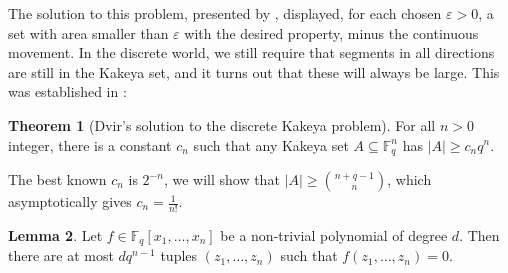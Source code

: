 \documentclass[12pt]{amsart}
\theoremstyle{definition}
\newtheorem{thm}{Theorem}[section]
\newtheorem{lm}[thm]{Lemma}
\newcommand{\F}{\mathbb{F}}
\begin{document}
The solution to this problem, presented by \cite{besicovitch1928kakeya}, displayed, for each chosen $\varepsilon > 0$, a set with area smaller than $\varepsilon $ with the desired property, minus the continuous movement.
In the discrete world, we still require that segments in all directions are still in the Kakeya set, and it turns out that these will always be large.
This was established in \cite{dvir2009size}:

\begin{thm}[Dvir's solution to the discrete Kakeya problem]\label{thm:kakeya}
For all $n > 0 $ integer, there is a constant $c_n$ such that any Kakeya set $A \subseteq \F_q^n$ has $|A| \geq c_n q^n$.
\end{thm}

The best known $c_n$ is $2^{-n}$, we will show that $|A| \geq \binom{n+q-1}{n}$, which asymptotically gives $c_n = \frac{1}{n!}$.

\begin{lm}\label{lm:rootcount}
Let $f \in \F_q[x_1, \ldots, x_n]$ be a non-trivial polynomial of degree $d$.
Then there are at most $d q^{n-1}$ tuples $(z_1, \ldots, z_n)$ such that $f(z_1, \ldots, z_n) = 0$.
\end{lm}
\end{document}
